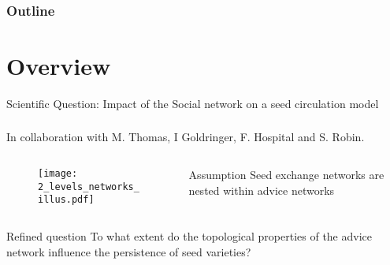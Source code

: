 \documentclass[nopagenumber,9pt]{beamer}
\begin{document}
\begin{frame}
\frametitle{Outline}
 \tableofcontents
\end{frame}



\section{Overview }


	\begin{frame}{Scientific Question: Impact of the Social network on a seed circulation model}
		\frametitle{}
		In collaboration with M. Thomas, I Goldringer, F. Hospital and S. Robin. \cite{barbillon2015network}
		\begin{columns}
			\begin{column}{5cm}
				\begin{center}
					\begin{figure}
						\texttt{[image: 2\_levels\_networks\_illus.pdf]}
					\end{figure}	
					\label{M. Thomas}
				\end{center}
			\end{column}
			\begin{column}{5cm}	
		\begin{exampleblock}{Assumption}
			Seed exchange networks are nested within advice networks
		\end{exampleblock}
			\end{column}	
		\end{columns}
		\begin{block}{ Refined question}
			 To what extent do the topological properties of the advice network influence the persistence of seed varieties?		
		\end{block}
		
		
	\end{frame}


	
\end{document}
